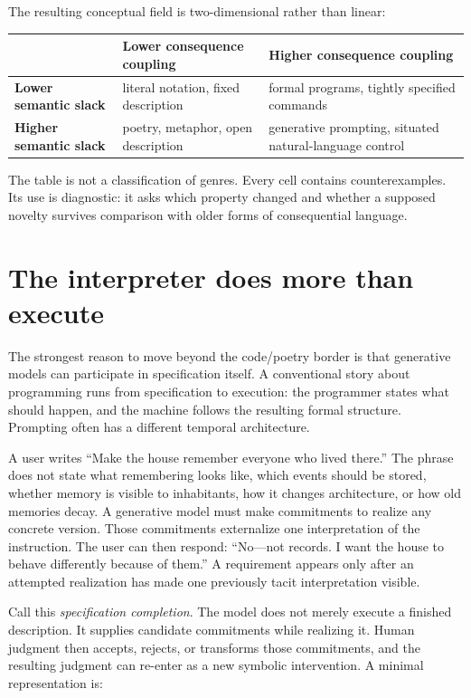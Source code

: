 \documentclass[11pt]{article}
\begin{document}
The resulting conceptual field is two-dimensional rather than linear:

\begin{center}
\begin{tabular}{>{\raggedright\arraybackslash}p{1.35in} p{1.65in} p{1.65in}}
\toprule
 & \textbf{Lower consequence coupling} & \textbf{Higher consequence coupling} \\
\midrule
\textbf{Lower semantic slack} & literal notation, fixed description & formal programs, tightly specified commands \\
\textbf{Higher semantic slack} & poetry, metaphor, open description & generative prompting, situated natural-language control \\
\bottomrule
\end{tabular}
\end{center}

The table is not a classification of genres. Every cell contains counterexamples. Its use is diagnostic: it asks which property changed and whether a supposed novelty survives comparison with older forms of consequential language.

\section{The interpreter does more than execute}

The strongest reason to move beyond the code/poetry border is that generative models can participate in specification itself. A conventional story about programming runs from specification to execution: the programmer states what should happen, and the machine follows the resulting formal structure. Prompting often has a different temporal architecture.

A user writes ``Make the house remember everyone who lived there.'' The phrase does not state what remembering looks like, which events should be stored, whether memory is visible to inhabitants, how it changes architecture, or how old memories decay. A generative model must make commitments to realize any concrete version. Those commitments externalize one interpretation of the instruction. The user can then respond: ``No---not records. I want the house to behave differently because of them.'' A requirement appears only after an attempted realization has made one previously tacit interpretation visible.

Call this \emph{specification completion}. The model does not merely execute a finished description. It supplies candidate commitments while realizing it. Human judgment then accepts, rejects, or transforms those commitments, and the resulting judgment can re-enter as a new symbolic intervention. A minimal representation is:
\end{document}
